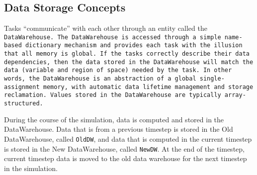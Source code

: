\subsection{Data Storage Concepts}

Tasks ``communicate'' with each other through an entity called the
\tt DataWarehouse. \normalfont  The \tt DataWarehouse \normalfont is accessed through a simple
name-based dictionary mechanism and provides each task with the
illusion that all memory is global.  If the tasks correctly describe
their data dependencies, then the data stored in the DataWarehouse
will match the data (variable and region of space) needed by the task.
In other words, the \tt DataWarehouse \normalfont is an abstraction of a global
single-assignment memory, with automatic data lifetime management and
storage reclamation.  Values stored in the \tt DataWarehouse \normalfont are
typically array-structured.

During the course of the simulation, data is computed and stored in
the DataWarehouse.  Data that is from a previous
timestep is stored in the Old DataWarehouse, called \texttt{OldDW},
and data that is computed in the current timestep is stored in the New
DataWarehouse, called \texttt{NewDW}.  At the end of the timestep,
current timestep data is moved to the old data warehouse for the next
timestep in the simulation.


